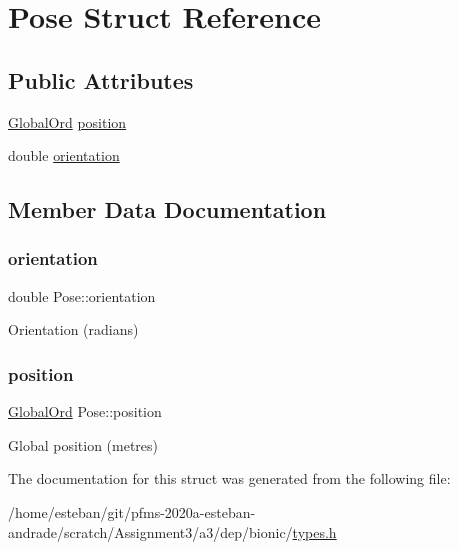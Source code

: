 \hypertarget{structPose}{}\section{Pose Struct Reference}
\label{structPose}
\subsection*{Public Attributes}
\begin{DoxyCompactItemize}
\item 
\hyperlink{structGlobalOrd}{Global\+Ord} \hyperlink{structPose_aba2eb8f799d1d392757d6c9490179720}{position}
\item 
double \hyperlink{structPose_a94d058eaab99263c6ab43bf53f4ebd9a}{orientation}
\end{DoxyCompactItemize}


\subsection{Member Data Documentation}
\mbox{\label{structPose_a94d058eaab99263c6ab43bf53f4ebd9a}} 
\subsubsection{\texorpdfstring{orientation}{orientation}}
{\footnotesize\ttfamily double Pose\+::orientation}

Orientation (radians) \mbox{\label{structPose_aba2eb8f799d1d392757d6c9490179720}} 
\subsubsection{\texorpdfstring{position}{position}}
{\footnotesize\ttfamily \hyperlink{structGlobalOrd}{Global\+Ord} Pose\+::position}

Global position (metres) 

The documentation for this struct was generated from the following file\+:\begin{DoxyCompactItemize}
\item 
/home/esteban/git/pfms-\/2020a-\/esteban-\/andrade/scratch/\+Assignment3/a3/dep/bionic/\hyperlink{bionic_2types_8h}{types.\+h}\end{DoxyCompactItemize}

